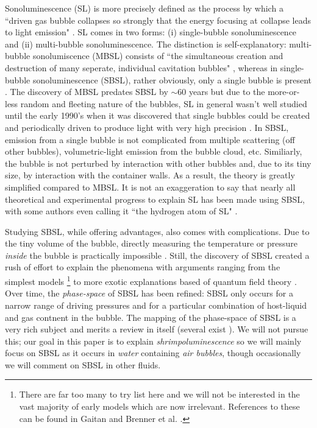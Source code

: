 \documentclass[rmp,aps,nofootinbib,superscriptaddress,floatfix]{revtex4-2}
\begin{document}
Sonoluminescence (SL) is more precisely defined as the process by which a ``driven gas bubble collapses so strongly that the energy focusing at collapse leads to light emission" \cite{brenner2002single}. SL comes in two forms: (i) single-bubble sonoluminescence and (ii) multi-bubble sonoluminescence. The distinction is self-explanatory: multi-bubble sonolumiscence (MBSL) consists of  ``the simultaneous creation and destruction of many seperate, individual cavitation bubbles" \cite{crum1994sonoluminescence,brenner2002single}, whereas in single-bubble sonoluminescence (SBSL), rather obviously, only a single bubble is present \cite{gaitan1992sonoluminescence}. The discovery of MBSL predates SBSL by $\sim$60 years but due to the more-or-less random and fleeting nature of the bubbles, SL in general wasn't well studied until the early 1990's when it was discovered that single bubbles could be created and periodically driven to produce light with very high precision \cite{crum1994sonoluminescence,gaitan1990experimental,gaitan1992sonoluminescence,brenner2002single}. In SBSL, emission from a single bubble is not complicated from multiple scattering (off other bubbles), volumetric-light emission from the bubble cloud, etc. Similiarly, the bubble is not perturbed by interaction with other bubbles and, due to its tiny size, by interaction with the container walls. As a result, the theory is greatly simplified compared to MBSL. It is not an exaggeration to say that nearly all theoretical and experimental progress to explain SL has been made using SBSL, with some authors even calling it ``the hydrogen atom of SL" \cite{lohse2018bubble,crum1994sonoluminescence}. 

Studying SBSL, while offering advantages, also comes with complications. Due to the tiny volume of the bubble, directly measuring the temperature or pressure \emph{inside} the bubble is practically impossible \cite{suslick2008inside}. Still, the discovery of SBSL created a rush of effort to explain the phenomena with arguments ranging from the simplest models \footnote{There are far too many to try list here and we will not be interested in the vast majority of early models which are now irrelevant. References to these can be found in Gaitan \cite{gaitan1990experimental} and Brenner et al. \cite{brenner2002single}.} to more exotic explanations based of quantum field theory \cite{schwinger1993casimir,eberlein1996sonoluminescence,liberati2000sonoluminescence}. Over time, the \emph{phase-space} of SBSL has been refined: SBSL only occurs for a narrow range of driving pressures and for a particular combination of host-liquid and gas contnent in the bubble. The mapping of the phase-space of SBSL is a very rich subject and merits a review in itself (several exist \cite{brenner2002single,yasui2018acoustic}). We will not pursue this; our goal in this paper is to explain \emph{shrimpoluminescence} so we will mainly focus on SBSL as it occurs in \emph{water} containing \emph{air bubbles}, though occasionally we will comment on SBSL in other fluids. 
\end{document}
